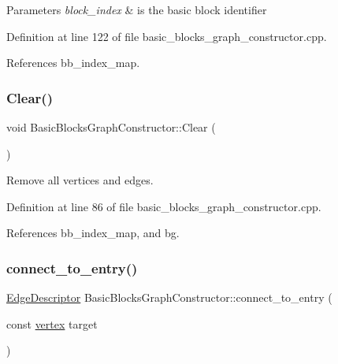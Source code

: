 \begin{DoxyParams}{Parameters}
{\em block\+\_\+index} & is the basic block identifier \\
\hline
\end{DoxyParams}


Definition at line 122 of file basic\+\_\+blocks\+\_\+graph\+\_\+constructor.\+cpp.



References bb\+\_\+index\+\_\+map.

\mbox{\label{classBasicBlocksGraphConstructor_af924271eb9b64c496a14b920012b0993}} 
\subsubsection{\texorpdfstring{Clear()}{Clear()}}
{\footnotesize\ttfamily void Basic\+Blocks\+Graph\+Constructor\+::\+Clear (\begin{DoxyParamCaption}{ }\end{DoxyParamCaption})}



Remove all vertices and edges. 



Definition at line 86 of file basic\+\_\+blocks\+\_\+graph\+\_\+constructor.\+cpp.



References bb\+\_\+index\+\_\+map, and bg.

\mbox{\label{classBasicBlocksGraphConstructor_a953d6610d95301b93d33117d9cdc8f65}} 
\subsubsection{\texorpdfstring{connect\+\_\+to\+\_\+entry()}{connect\_to\_entry()}}
{\footnotesize\ttfamily \hyperlink{graph_8hpp_a9eb9afea34e09f484b21f2efd263dd48}{Edge\+Descriptor} Basic\+Blocks\+Graph\+Constructor\+::connect\+\_\+to\+\_\+entry (\begin{DoxyParamCaption}\item[{const \hyperlink{graph_8hpp_abefdcf0544e601805af44eca032cca14}{vertex}}]{target }\end{DoxyParamCaption})}



